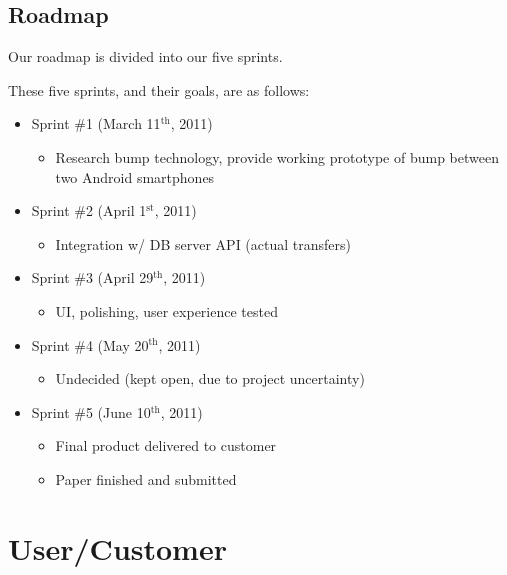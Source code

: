 \documentclass[a4paper,11pt]{article}
\begin{document}
\subsection{Roadmap} %
\label{subsec:roadmap}
Our roadmap is divided into our five sprints.

These five sprints, and their goals, are as follows:
\begin{itemize}
	\item Sprint \#1 (March 11$^{\text{th}}$, 2011)
	\begin{itemize}
		\item Research bump technology, provide working prototype of bump between two Android smartphones
	\end{itemize}
	
	\item Sprint \#2 (April 1$^{\text{st}}$, 2011)
	\begin{itemize}
		\item Integration w/ DB server API (actual transfers)
	\end{itemize}
	
	\item Sprint \#3 (April 29$^{\text{th}}$, 2011)
	\begin{itemize}
		\item UI, polishing, user experience tested
	\end{itemize}
	
	\item Sprint \#4 (May 20$^{\text{th}}$, 2011)
	\begin{itemize}
		\item Undecided (kept open, due to project uncertainty)
	\end{itemize}
	
	\item Sprint \#5 (June 10$^{\text{th}}$, 2011)
	\begin{itemize}
		\item Final product delivered to customer
		\item Paper finished and submitted
	\end{itemize}
\end{itemize}


\section{User/Customer} %
\label{sec:user_customer}
\end{document}
